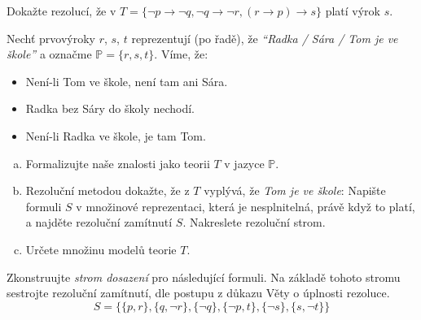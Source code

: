 \begin{problem}

    Dokažte rezolucí, že v $T=\{\neg p \to \neg q,\neg q \to \neg r, (r\to p)\to s\}$ platí výrok $s$.

    \begin{solution}
                    
    \end{solution}

\end{problem}


\begin{problem}
    
    Nechť prvovýroky $r$, $s$, $t$  reprezentují (po řadě), že \emph{``Radka / Sára / Tom je ve škole''} a označme $\mathbb{P}=\{r,s,t\}$. Víme, že:
    \begin{itemize}\it
        \item Není-li Tom ve škole, není tam ani Sára.
        \item Radka bez Sáry do školy nechodí.
        \item Není-li Radka ve škole, je tam Tom.
    \end{itemize}
    \begin{enumerate}[(a)]
        \item Formalizujte naše znalosti jako teorii $T$ v jazyce $\mathbb P$.
        \item Rezoluční metodou dokažte, že z $T$ vyplývá, že \emph{Tom je ve škole}: Napište formuli $S$ v množinové reprezentaci, která je nesplnitelná, právě když to platí, a najděte rezoluční zamítnutí $S$. Nakreslete rezoluční strom.
        \item Určete množinu modelů teorie $T$.
    \end{enumerate}

    \begin{solution}
                    
    \end{solution}

\end{problem}


\begin{problem}
        
    Zkonstruujte \emph{strom dosazení} pro následující formuli. Na základě tohoto stromu sestrojte rezoluční zamítnutí, dle postupu z důkazu Věty o úplnosti rezoluce.
    $$
    S=\{\{p,r\},\{q,\neg r\},\{\neg q\},\{\neg p,t\},\{\neg s\},\{s,\neg t\}\}
    $$

    \begin{solution}
                    
    \end{solution}
    
\end{problem}
        

